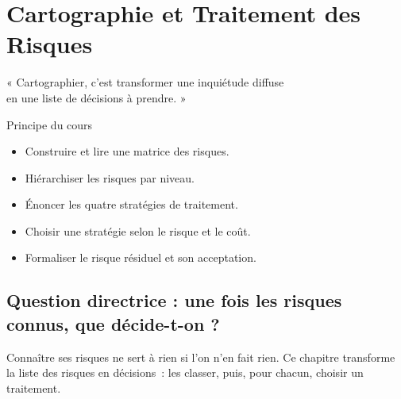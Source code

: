 
\chapter{Cartographie et Traitement des Risques}
\label{chap:traitement}

\epigraph{%
    « Cartographier, c'est transformer une inquiétude diffuse\\
    en une liste de décisions à prendre. »%
}{Principe du cours}


\begin{boxobjectifs}
\begin{itemize}
    \item Construire et lire une matrice des risques.
    \item Hiérarchiser les risques par niveau.
    \item Énoncer les quatre stratégies de traitement.
    \item Choisir une stratégie selon le risque et le coût.
    \item Formaliser le risque résiduel et son acceptation.
\end{itemize}
\end{boxobjectifs}

\bigskip

\section*{Question directrice : une fois les risques connus, que décide-t-on ?}

Connaître ses risques ne sert à rien si l'on n'en fait rien. Ce chapitre
transforme la liste des risques en décisions~: les classer, puis, pour chacun,
choisir un traitement.

